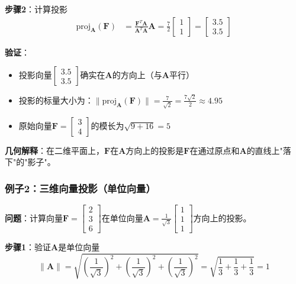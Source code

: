 \documentclass[12pt,a4paper]{article}
\begin{document}
\textbf{步骤2}：计算投影
\begin{align}
\text{proj}_{\bm{A}}(\bm{F}) &= \frac{\bm{F}^T \bm{A}}{\bm{A}^T \bm{A}} \bm{A} = \frac{7}{2} \begin{bmatrix} 1 \\ 1 \end{bmatrix} = \begin{bmatrix} 3.5 \\ 3.5 \end{bmatrix}
\end{align}

\textbf{验证}：
\begin{itemize}
\item 投影向量$\begin{bmatrix} 3.5 \\ 3.5 \end{bmatrix}$确实在$\bm{A}$的方向上（与$\bm{A}$平行）
\item 投影的标量大小为：$\|\text{proj}_{\bm{A}}(\bm{F})\| = \frac{7}{\sqrt{2}} = \frac{7\sqrt{2}}{2} \approx 4.95$
\item 原始向量$\bm{F} = \begin{bmatrix} 3 \\ 4 \end{bmatrix}$的模长为$\sqrt{9+16} = 5$
\end{itemize}

\textbf{几何解释}：在二维平面上，$\bm{F}$在$\bm{A}$方向上的投影是$\bm{F}$在通过原点和$\bm{A}$的直线上"落下"的"影子"。

\subsubsection{例子2：三维向量投影（单位向量）}

\textbf{问题}：计算向量$\bm{F} = \begin{bmatrix} 2 \\ 3 \\ 6 \end{bmatrix}$在单位向量$\bm{A} = \frac{1}{\sqrt{3}}\begin{bmatrix} 1 \\ 1 \\ 1 \end{bmatrix}$方向上的投影。

\textbf{步骤1}：验证$\bm{A}$是单位向量
\begin{equation}
\|\bm{A}\| = \sqrt{\left(\frac{1}{\sqrt{3}}\right)^2 + \left(\frac{1}{\sqrt{3}}\right)^2 + \left(\frac{1}{\sqrt{3}}\right)^2} = \sqrt{\frac{1}{3} + \frac{1}{3} + \frac{1}{3}} = 1
\end{equation}
\end{document}
